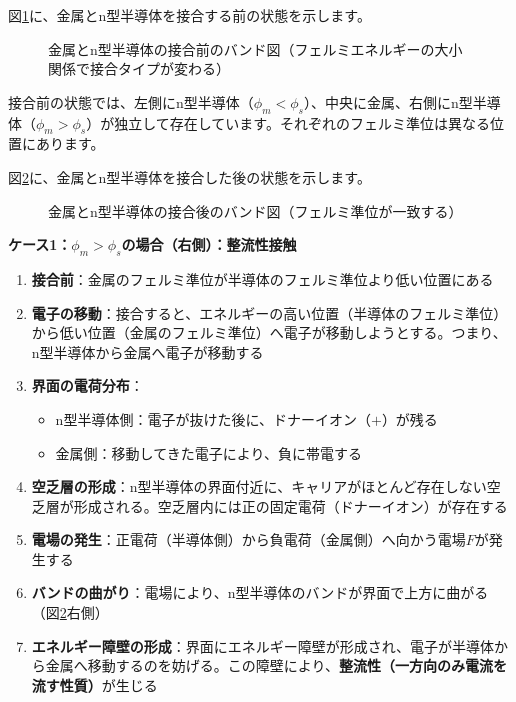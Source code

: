 図\ref{fig:metal_n_before}に、金属とn型半導体を接合する前の状態を示します。

\begin{figure}[H]
\centering
{}
\caption{金属とn型半導体の接合前のバンド図（フェルミエネルギーの大小関係で接合タイプが変わる）}
\label{fig:metal_n_before}
\end{figure}

接合前の状態では、左側にn型半導体（$\phi_m < \phi_s$）、中央に金属、右側にn型半導体（$\phi_m > \phi_s$）が独立して存在しています。それぞれのフェルミ準位は異なる位置にあります。

図\ref{fig:metal_n_after}に、金属とn型半導体を接合した後の状態を示します。

\begin{figure}[H]
\centering
{}
\caption{金属とn型半導体の接合後のバンド図（フェルミ準位が一致する）}
\label{fig:metal_n_after}
\end{figure}

\textbf{ケース1：$\phi_m > \phi_s$の場合（右側）：整流性接触}

\begin{enumerate}
\item \textbf{接合前}：金属のフェルミ準位が半導体のフェルミ準位より低い位置にある

\item \textbf{電子の移動}：接合すると、エネルギーの高い位置（半導体のフェルミ準位）から低い位置（金属のフェルミ準位）へ電子が移動しようとする。つまり、n型半導体から金属へ電子が移動する

\item \textbf{界面の電荷分布}：
\begin{itemize}
\item n型半導体側：電子が抜けた後に、ドナーイオン（$+$）が残る
\item 金属側：移動してきた電子により、負に帯電する
\end{itemize}

\item \textbf{空乏層の形成}：n型半導体の界面付近に、キャリアがほとんど存在しない空乏層が形成される。空乏層内には正の固定電荷（ドナーイオン）が存在する

\item \textbf{電場の発生}：正電荷（半導体側）から負電荷（金属側）へ向かう電場$F$が発生する

\item \textbf{バンドの曲がり}：電場により、n型半導体のバンドが界面で上方に曲がる（図\ref{fig:metal_n_after}右側）

\item \textbf{エネルギー障壁の形成}：界面にエネルギー障壁が形成され、電子が半導体から金属へ移動するのを妨げる。この障壁により、\textbf{整流性（一方向のみ電流を流す性質）}が生じる
\end{enumerate}

